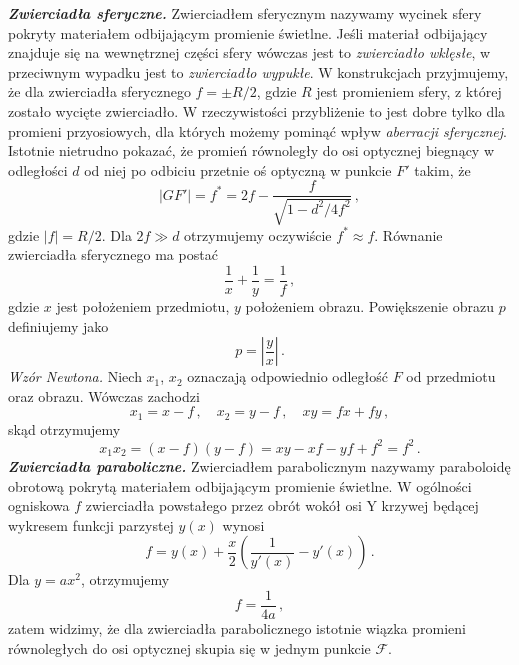 \documentclass[../main.tex]{subfiles}
\begin{document}
\textbf{\textit{Zwierciadła sferyczne.}} Zwierciadłem sferycznym nazywamy wycinek sfery pokryty
materiałem odbijającym promienie świetlne. Jeśli materiał odbijający znajduje się na wewnętrznej
części sfery wówczas jest to \textit{zwierciadło wklęsłe}, w przeciwnym wypadku jest to
\textit{zwierciadło wypukłe}. W konstrukcjach przyjmujemy, że dla zwierciadła sferycznego \(f=\pm
R/2\), gdzie \(R\) jest promieniem sfery, z której zostało wycięte zwierciadło. W rzeczywistości
przybliżenie to jest dobre tylko dla promieni przyosiowych, dla których możemy pominąć wpływ
\textit{aberracji sferycznej}. Istotnie nietrudno pokazać, że promień równoległy do osi optycznej
biegnący w odległości \(d\) od niej po odbiciu przetnie oś optyczną w punkcie \(F'\) takim, że
\begin{equation*}
    |GF'|=f^*=2f-\frac{f}{\sqrt{1-d^2/4f^2}}\,,
\end{equation*}
gdzie \(|f|=R/2\). Dla \(2f\gg d\) otrzymujemy oczywiście \(f^*\approx f\). Równanie zwierciadła
sferycznego ma postać
\begin{equation*}
    \frac{1}{x}+\frac{1}{y}=\frac{1}{f}\,,
\end{equation*}
gdzie \(x\) jest położeniem przedmiotu, \(y\) położeniem obrazu. Powiększenie obrazu \(p\)
definiujemy jako
\begin{equation*}
    p=\left|\frac{y}{x}\right|\,.
\end{equation*}
\textit{Wzór Newtona.} Niech \(x_1\), \(x_2\) oznaczają odpowiednio odległość \(F\) od przedmiotu
oraz obrazu. Wówczas zachodzi
\begin{equation*}
    x_1=x-f\,,\quad x_2=y-f\,,\quad xy=fx+fy\,,
\end{equation*}
skąd otrzymujemy
\begin{equation*}
    x_1x_2=(x-f)(y-f)=xy-xf-yf+f^2=f^2\,.
\end{equation*}
\indent \textbf{\textit{Zwierciadła paraboliczne.}} Zwierciadłem parabolicznym nazywamy paraboloidę
obrotową pokrytą materiałem odbijającym promienie świetlne. W ogólności ogniskowa \(f\) zwierciadła
powstałego przez obrót wokół osi Y krzywej będącej wykresem funkcji parzystej \(y(x)\) wynosi
\begin{equation*}
   f=y(x)+\frac{x}{2}\left(\frac{1}{y'(x)}-y'(x)\right)\,.
\end{equation*}
Dla \(y=ax^2\), otrzymujemy
\begin{equation*}
    f=\frac{1}{4a}\,,
\end{equation*}
zatem widzimy, że dla zwierciadła parabolicznego istotnie wiązka promieni równoległych do osi
optycznej skupia się w jednym punkcie \(\mathcal{F}\).
\medskip
\end{document}
